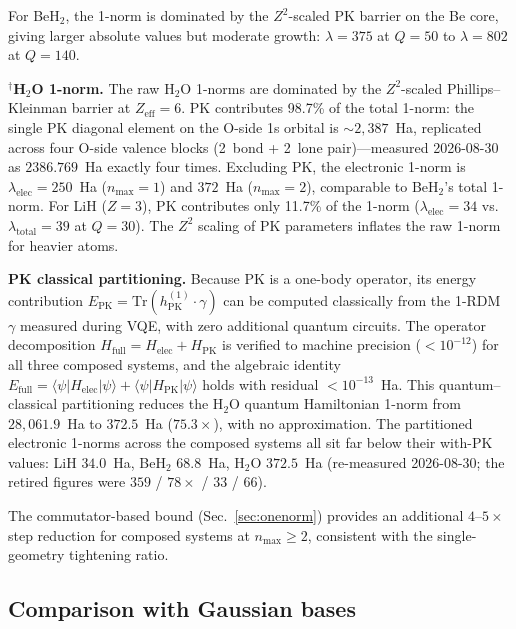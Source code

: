 \documentclass[aps,pra,twocolumn,superscriptaddress,longbibliography]{revtex4-2}
\begin{document}
For BeH$_2$, the 1-norm is dominated by the $Z^2$-scaled PK barrier
on the Be core, giving larger absolute values but moderate growth:
$\lambda = 375$ at $Q = 50$ to $\lambda = 802$ at $Q = 140$.

$^\dagger$\textbf{H$_2$O 1-norm.}  The raw H$_2$O 1-norms are
dominated by the $Z^2$-scaled Phillips--Kleinman barrier at
$Z_{\mathrm{eff}} = 6$.  PK contributes 98.7\% of the total 1-norm:
the single PK diagonal element on the O-side 1s orbital is
$\sim 2{,}387$~Ha, replicated across four O-side valence blocks
(2~bond + 2~lone pair)---measured 2026-08-30 as $2386.769$~Ha exactly
four times.  Excluding PK, the electronic 1-norm is
$\lambda_{\mathrm{elec}} = 250$~Ha ($n_{\max} = 1$) and $372$~Ha
($n_{\max} = 2$), comparable to BeH$_2$'s total 1-norm.  For LiH
($Z = 3$), PK contributes only 11.7\% of the 1-norm ($\lambda_{\mathrm{elec}} = 34$
vs.\ $\lambda_{\mathrm{total}} = 39$ at $Q = 30$).  The $Z^2$ scaling
of PK parameters inflates the raw 1-norm for heavier atoms.

\textbf{PK classical partitioning.}
Because PK is a one-body operator, its energy contribution
$E_{\mathrm{PK}} = \mathrm{Tr}(h^{(1)}_{\mathrm{PK}} \cdot \gamma)$
can be computed classically from the 1-RDM $\gamma$ measured during VQE,
with zero additional quantum circuits.  The operator decomposition
$H_{\mathrm{full}} = H_{\mathrm{elec}} + H_{\mathrm{PK}}$ is verified
to machine precision ($< 10^{-12}$) for all three composed systems,
and the algebraic identity
$E_{\mathrm{full}} = \langle\psi|H_{\mathrm{elec}}|\psi\rangle
+ \langle\psi|H_{\mathrm{PK}}|\psi\rangle$
holds with residual $< 10^{-13}$~Ha.
This quantum--classical partitioning reduces the H$_2$O quantum
Hamiltonian 1-norm from $28{,}061.9$~Ha to $372.5$~Ha ($75.3\times$),
with no approximation.  The partitioned electronic 1-norms across the
composed systems all sit far below their with-PK values: LiH $34.0$~Ha,
BeH$_2$ $68.8$~Ha, H$_2$O $372.5$~Ha (re-measured 2026-08-30; the
retired figures were $359$ / $78\times$ / $33$ / $66$).

The commutator-based bound (Sec.~\ref{sec:onenorm}) provides an
additional $4$--$5\times$ step reduction for composed systems at
$n_{\max} \ge 2$, consistent with the single-geometry tightening
ratio.


\subsection{Comparison with Gaussian bases}
\label{sec:composed_gaussian}
\end{document}
